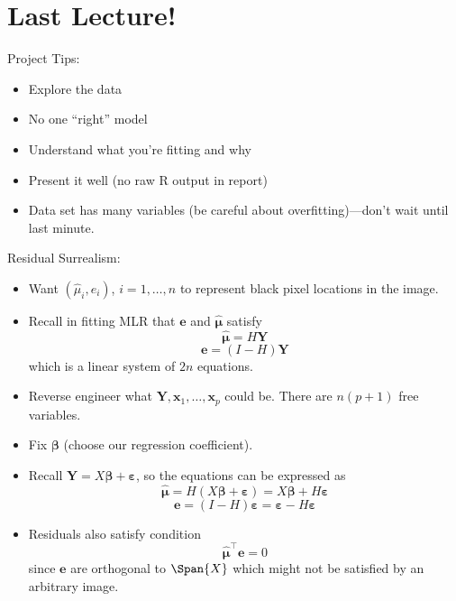 \section{Last Lecture!}
Project Tips:
\begin{itemize}
    \item Explore the data
    \item No one ``right'' model
    \item Understand what you're fitting and why
    \item Present it well (no raw R output in report)
    \item Data set has many variables (be careful
          about overfitting)---don't wait until last minute.
\end{itemize}
Residual Surrealism:
\begin{itemize}
    \item Want $ (\hat{\mu}_i,e_i) $, $ i=1,\ldots,n $
          to represent black pixel locations in the image.
    \item Recall in fitting MLR that $ \symbf{e} $
          and $ \hat{\symbf{\mu}} $ satisfy
          \[ \hat{\symbf{\mu}}=H\symbf{Y} \]
          \[ \symbf{e}=(I-H)\symbf{Y} \]
          which is a linear system of $ 2n $ equations.
    \item Reverse engineer what $ \symbf{Y},\symbf{x}_1,\ldots,\symbf{x}_p $
          could be. There are $ n(p+1) $ free variables.
    \item Fix $ \symbf{\beta} $ (choose our regression coefficient).
    \item Recall $ \symbf{Y}=X \symbf{\beta}+\symbf{\varepsilon} $,
          so the equations can be expressed as
          \[ \hat{\symbf{\mu}}=H(X \symbf{\beta}+\symbf{\varepsilon})=
              X \symbf{\beta}+H \symbf{\varepsilon} \]
          \[ \symbf{e}=(I-H)\symbf{\varepsilon}=
              \symbf{\varepsilon}-H \symbf{\varepsilon} \]
    \item Residuals also satisfy condition
          \[ \hat{\symbf{\mu}}^\top \symbf{e}=0 \]
          since $ \symbf{e} $ are orthogonal to $ \Span{X} $
          which might not be satisfied by an arbitrary image.


\end{itemize}
